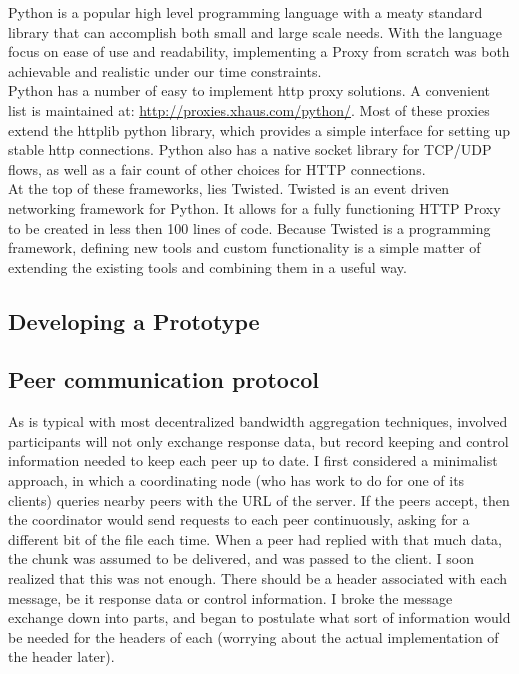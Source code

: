 \documentclass[12pt]{article}
\begin{document}
			Python is a popular high level programming language with a meaty standard library that can accomplish both small and large scale needs. With the language focus on ease of use and readability, implementing a Proxy from scratch was both achievable and realistic under our time constraints. \\

			Python has a number of easy to implement http proxy solutions. A convenient list is maintained at: \url{http://proxies.xhaus.com/python/}. Most of these proxies extend the httplib python library, which provides a simple interface for setting up stable http connections. Python also has a native socket library for TCP/UDP flows, as well as a fair count of other choices for HTTP connections. \\
			
			At the top of these frameworks, lies Twisted. Twisted is an event driven networking framework for Python. It allows for a fully functioning HTTP Proxy to be created in less then 100 lines of code. Because Twisted is a programming framework, defining new tools and custom functionality is a simple matter of extending the existing tools and combining them in a useful way. \\

			

	\subsection{Developing a Prototype}




	\subsection{Peer communication protocol}

		As is typical with most decentralized bandwidth aggregation techniques, involved participants will not only exchange response data, but record keeping and control information needed to keep each peer up to date. I first considered a minimalist approach, in which a coordinating node (who has work to do for one of its clients) queries nearby peers with the URL of the server. If the peers accept, then the coordinator would send requests to each peer continuously, asking for a different bit of the file each time. When a peer had replied with that much data, the chunk was assumed to be delivered, and was passed to the client. I soon realized that this was not enough. There should be a header associated with each message, be it response data or control information. I broke the message exchange down into parts, and began to postulate what sort of information would be needed for the headers of each (worrying about the actual implementation of the header later). \\
\end{document}
